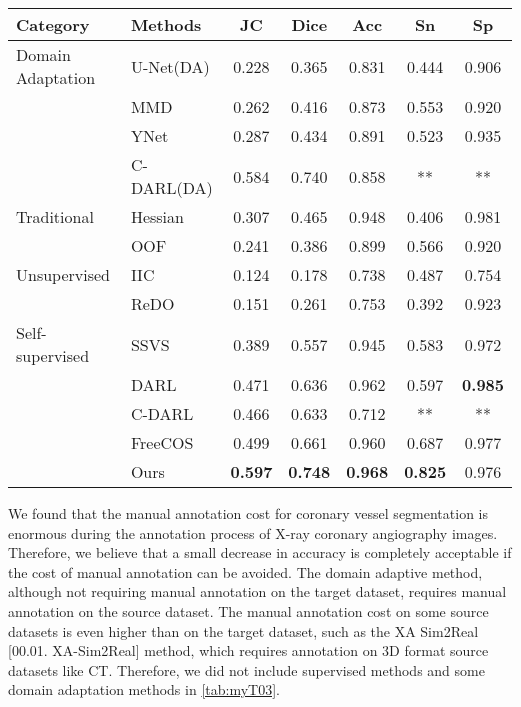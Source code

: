 \begin{table*}[h]
    \centering
    \caption{Quantitative evaluation of Our Method compared with different methods on the XCAD dataset}
    \label{tab:quantitative}
    \begin{tabular}{llccccc}
    \toprule
    \textbf{Category} & \textbf{Methods} & \textbf{JC} & \textbf{Dice} & \textbf{Acc} & \textbf{Sn} & \textbf{Sp} \\
    \midrule
    
    \multirow{}{}{Domain Adaptation} 
    & U-Net(DA) & 0.228 & 0.365 & 0.831 & 0.444 & 0.906 \\
    & MMD & 0.262 & 0.416 & 0.873 & 0.553 & 0.920 \\
    & YNet & 0.287 & 0.434 & 0.891 & 0.523 & 0.935 \\
    & C-DARL(DA) & 0.584 & 0.740 & 0.858 & ** & ** \\
    
    \midrule
    
    \multirow{}{}{Traditional} 
    & Hessian & 0.307 & 0.465 & 0.948 & 0.406 & 0.981 \\
    & OOF & 0.241 & 0.386 & 0.899 & 0.566 & 0.920 \\
    
    \midrule
    
    \multirow{}{}{Unsupervised} 
    & IIC & 0.124 & 0.178 & 0.738 & 0.487 & 0.754 \\
    & ReDO & 0.151 & 0.261 & 0.753 & 0.392 & 0.923 \\
    
    \midrule
    
    \multirow{}{}{Self-supervised} 
    & SSVS & 0.389 & 0.557 & 0.945 & 0.583 & 0.972 \\
    & DARL & 0.471 & 0.636 & 0.962 & 0.597 & \textbf{0.985} \\
    & C-DARL & 0.466 & 0.633 & 0.712 & ** & ** \\
    & FreeCOS & 0.499 & 0.661 & 0.960 & 0.687 & 0.977 \\
    & Ours & \textbf{0.597} & \textbf{0.748} & \textbf{0.968} & \textbf{0.825} & 0.976 \\
    
    \bottomrule
    \end{tabular}
    \label{tab:myT03}
\end{table*}

We found that the manual annotation cost for coronary vessel segmentation is enormous during the annotation process of X-ray coronary angiography images. Therefore, we believe that a small decrease in accuracy is completely acceptable if the cost of manual annotation can be avoided. The domain adaptive method, although not requiring manual annotation on the target dataset, requires manual annotation on the source dataset. The manual annotation cost on some source datasets is even higher than on the target dataset, such as the XA Sim2Real [00.01. XA-Sim2Real] method, which requires annotation on 3D format source datasets like CT. 
Therefore, we did not include supervised methods and some domain adaptation methods in \cref{tab:myT03}.

